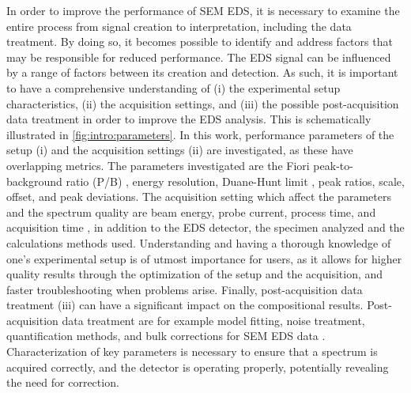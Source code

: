 In order to improve the performance of SEM EDS, it is necessary to examine the entire process from signal creation to interpretation, including the data treatment.
By doing so, it becomes possible to identify and address factors that may be responsible for reduced performance.
The EDS signal can be influenced by a range of factors between its creation and detection.
As such, it is important to have a comprehensive understanding of (i) the experimental setup characteristics, (ii) the acquisition settings, and (iii) the possible post-acquisition data treatment in order to improve the EDS analysis.
This is schematically illustrated in \cref{fig:intro:parameters}.
In this work, performance parameters of the setup (i) and the acquisition settings (ii) are investigated, as these have overlapping metrics.
The parameters investigated are the Fiori peak-to-background ratio (P/B) \cite{fiori_peak_background_1982}, energy resolution, Duane-Hunt limit \cite{Duane_Hunt_1915}, peak ratios, scale, offset, and peak deviations.
The acquisition setting which affect the parameters and the spectrum quality are beam energy, probe current, process time, and acquisition time \cite{goldstein_scanning_2018}, in addition to the EDS detector, the specimen analyzed and the calculations methods used.
Understanding and having a thorough knowledge of one's experimental setup is of utmost importance for users, as it allows for higher quality results through the optimization of the setup and the acquisition, and faster troubleshooting when problems arise.
Finally, post-acquisition data treatment (iii) can have a significant impact on the compositional results.
Post-acquisition data treatment are for example model fitting, noise treatment, quantification methods, and bulk corrections for SEM EDS data \cite{goldstein_scanning_2018,williams_carter_tem_2009,pap_1991,hollas_modern_2004}.
Characterization of key parameters is necessary to ensure that a spectrum is acquired correctly, and the detector is operating properly, potentially revealing the need for correction.


